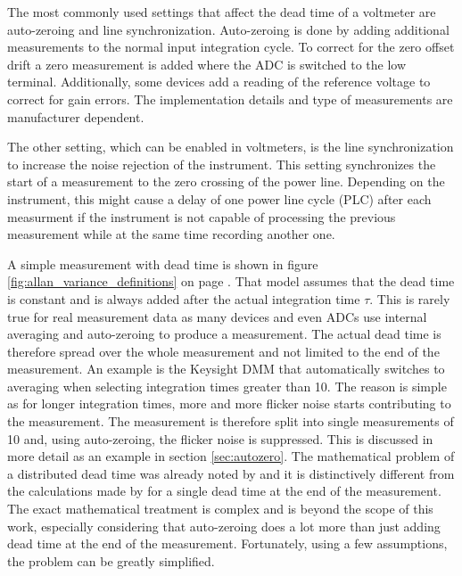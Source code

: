 The most commonly used settings that affect the dead time of a voltmeter are auto-zeroing and line synchronization. Auto-zeroing is done by adding additional measurements to the normal input integration cycle. To correct for the zero offset drift a zero measurement is added where the ADC is switched to the low terminal. Additionally, some devices add a reading of the reference voltage to correct for gain errors. The implementation details and type of measurements are manufacturer dependent.

The other setting, which can be enabled in voltmeters, is the line synchronization to increase the noise rejection of the instrument. This setting synchronizes the start of a measurement to the zero crossing of the power line. Depending on the instrument, this might cause a delay of one power line cycle (PLC) after each measurment if the instrument is not capable of processing the previous measurement while at the same time recording another one.

A simple measurement with dead time is shown in figure \ref{fig:allan_variance_definitions} on page \pageref{fig:allan_variance_definitions}. That model assumes that the dead time is constant and is always added after the actual integration time $\tau$. This is rarely true for real measurement data as many devices and even ADCs use internal averaging and auto-zeroing to produce a measurement. The actual dead time is therefore spread over the whole measurement and not limited to the end of the measurement. An example is the Keysight  DMM that automatically switches to averaging when selecting integration times greater than \qty{10}{\plc}. The reason is simple as for longer integration times, more and more flicker noise starts contributing to the measurement. The measurement is therefore split into single measurements of \qty{10}{\plc} and, using auto-zeroing, the flicker noise is suppressed. This is discussed in more detail as an example in section \ref{sec:autozero}. The mathematical problem of a distributed dead time was already noted by \citeauthor{adev_noise_types} \cite{adev_noise_types} and it is distinctively different from the calculations made by \citeauthor{psd_to_adev} \cite{psd_to_adev} for a single dead time at the end of the measurement. The exact mathematical treatment is complex and is beyond the scope of this work, especially considering that auto-zeroing does a lot more than just adding dead time at the end of the measurement. Fortunately, using a few assumptions, the problem can be greatly simplified.

